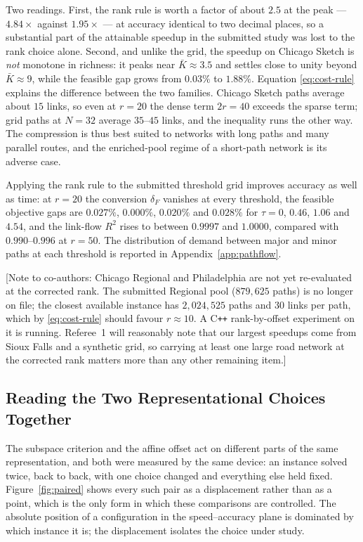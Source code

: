 \documentclass[11pt]{article}
\newif\ifshownotes \shownotestrue
\newcommand{\conote}[1]{\ifshownotes{\color{red}\small\textsf{[Note to co-authors: #1]}}\fi}
\begin{document}
Two readings. First, the rank rule is worth a factor of about $2.5$ at the peak --- $4.84
\times$ against $1.95\times$ --- at accuracy identical to two decimal places, so a
substantial part of the attainable speedup in the submitted study was lost to the rank
choice alone. Second, and unlike the grid, the speedup on Chicago Sketch is \emph{not}
monotone in richness: it peaks near $\bar K\approx3.5$ and settles close to unity beyond
$\bar K\approx9$, while the feasible gap grows from $0.03\%$ to $1.88\%$. Equation
\eqref{eq:cost-rule} explains the difference between the two families. Chicago Sketch paths
average about $15$ links, so even at $r=20$ the dense term $2r=40$ exceeds the sparse term;
grid paths at $N=32$ average $35$--$45$ links, and the inequality runs the other way. The
compression is thus best suited to networks with long paths and many parallel routes, and the
enriched-pool regime of a short-path network is its adverse case.

Applying the rank rule to the submitted threshold grid improves accuracy as well as time: at
$r=20$ the conversion $\delta_F$ vanishes at every threshold, the feasible objective gaps are
$0.027\%$, $0.000\%$, $0.020\%$ and $0.028\%$ for $\tau=0$, $0.46$, $1.06$ and $4.54$, and
the link-flow $R^2$ rises to between $0.9997$ and $1.0000$, compared with $0.990$--$0.996$ at
$r=50$. The distribution of demand between major and minor paths at each threshold is
reported in Appendix~\ref{app:pathflow}.

\conote{Chicago Regional and Philadelphia are not yet re-evaluated at the corrected rank. The
submitted Regional pool ($879{,}625$ paths) is no longer on file; the closest available
instance has $2{,}024{,}525$ paths and $30$ links per path, which by \eqref{eq:cost-rule}
should favour $r\approx10$. A C\texttt{++} rank-by-offset experiment on it is running.
Referee~1 will reasonably note that our largest speedups come from Sioux Falls and a synthetic
grid, so carrying at least one large road network at the corrected rank matters more than any
other remaining item.}


\subsection{Reading the Two Representational Choices Together}
\label{sec:tradeoff}

The subspace criterion and the affine offset act on different parts of the same representation,
and both were measured by the same device: an instance solved twice, back to back, with one
choice changed and everything else held fixed. Figure~\ref{fig:paired} shows every such pair as
a displacement rather than as a point, which is the only form in which these comparisons are
controlled. The absolute position of a configuration in the speed--accuracy plane is dominated
by which instance it is; the displacement isolates the choice under study.
\end{document}
